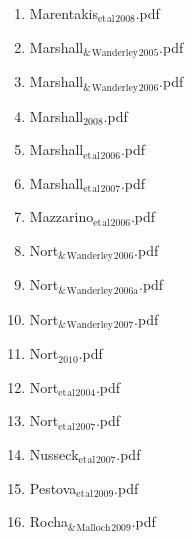 \documentclass[11pt]{article}
\begin{document}
\begin{enumerate}
\begin{enumerate}
\begin{enumerate}
\item Marentakis$_{\text{et}}$$_{\text{al}}$$_{\text{2008}}$.pdf
\label{sec-1-1-1-1-15-7-2-35}

\item Marshall$_{\text{\&}}$$_{\text{Wanderley}}$$_{\text{2005}}$.pdf
\label{sec-1-1-1-1-15-7-2-36}

\item Marshall$_{\text{\&}}$$_{\text{Wanderley}}$$_{\text{2006}}$.pdf
\label{sec-1-1-1-1-15-7-2-37}

\item Marshall$_{\text{2008}}$.pdf
\label{sec-1-1-1-1-15-7-2-38}

\item Marshall$_{\text{et}}$$_{\text{al}}$$_{\text{2006}}$.pdf
\label{sec-1-1-1-1-15-7-2-39}

\item Marshall$_{\text{et}}$$_{\text{al}}$$_{\text{2007}}$.pdf
\label{sec-1-1-1-1-15-7-2-40}

\item Mazzarino$_{\text{et}}$$_{\text{al}}$$_{\text{2006}}$.pdf
\label{sec-1-1-1-1-15-7-2-41}

\item Nort$_{\text{\&}}$$_{\text{Wanderley}}$$_{\text{2006}}$.pdf
\label{sec-1-1-1-1-15-7-2-42}

\item Nort$_{\text{\&}}$$_{\text{Wanderley}}$$_{\text{2006a}}$.pdf
\label{sec-1-1-1-1-15-7-2-43}

\item Nort$_{\text{\&}}$$_{\text{Wanderley}}$$_{\text{2007}}$.pdf
\label{sec-1-1-1-1-15-7-2-44}

\item Nort$_{\text{2010}}$.pdf
\label{sec-1-1-1-1-15-7-2-45}

\item Nort$_{\text{et}}$$_{\text{al}}$$_{\text{2004}}$.pdf
\label{sec-1-1-1-1-15-7-2-46}

\item Nort$_{\text{et}}$$_{\text{al}}$$_{\text{2007}}$.pdf
\label{sec-1-1-1-1-15-7-2-47}

\item Nusseck$_{\text{et}}$$_{\text{al}}$$_{\text{2007}}$.pdf
\label{sec-1-1-1-1-15-7-2-48}

\item Pestova$_{\text{et}}$$_{\text{al}}$$_{\text{2009}}$.pdf
\label{sec-1-1-1-1-15-7-2-49}

\item Rocha$_{\text{\&}}$$_{\text{Malloch}}$$_{\text{2009}}$.pdf
\label{sec-1-1-1-1-15-7-2-50}


\end{enumerate}
\end{enumerate}
\end{enumerate}
\end{document}
